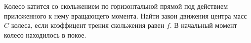Колесо катится со скольжением по горизонтальной прямой под действием приложенного к нему вращающего момента. Найти закон движения центра масс $C$ колеса, если коэффицент трения 
скольжения равен $f$. В начальный момент колесо находилось в покое.
